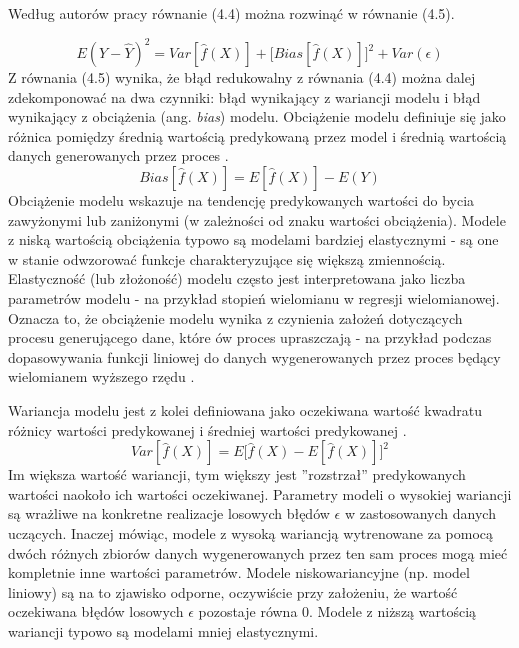 \documentclass[notitlepage]{report}
\begin{document}
Według autorów pracy \cite{islr} równanie (4.4) można rozwinąć w równanie (4.5).

\begin{equation}
E(Y-\hat{Y})^2 = Var[\hat{f}(X)] + \big[Bias[\hat{f}(X)]\big]^2 + Var(\epsilon)
\end{equation}
Z równania (4.5) wynika, że błąd redukowalny z równania (4.4) można dalej zdekomponować na dwa czynniki: błąd wynikający z wariancji modelu i błąd wynikający z obciążenia (ang. \textit{bias}) modelu. Obciążenie modelu definiuje się jako różnica pomiędzy średnią wartością predykowaną przez model i średnią wartością danych generowanych przez proces \cite{prml} \cite{eslii} \cite{leborgne}.
\begin{equation}
Bias[\hat{f}(X)] = E[\hat{f}(X)] - E(Y)
\end{equation}
Obciążenie modelu wskazuje na tendencję predykowanych wartości do bycia zawyżonymi lub zaniżonymi (w zależności od znaku wartości obciążenia). Modele z niską wartością obciążenia typowo są modelami bardziej elastycznymi - są one w stanie odwzorować funkcje charakteryzujące się większą zmiennością. Elastyczność (lub złożoność) modelu często jest interpretowana jako liczba parametrów modelu - na przykład stopień wielomianu w regresji wielomianowej. Oznacza to, że obciążenie modelu wynika z czynienia założeń dotyczących procesu generującego dane, które ów proces upraszczają - na przykład podczas dopasowywania funkcji liniowej do danych wygenerowanych przez proces będący wielomianem wyższego rzędu \cite{islr}. 

Wariancja modelu jest z kolei definiowana jako oczekiwana wartość kwadratu różnicy wartości predykowanej i średniej wartości predykowanej \cite{prml} \cite{leborgne}.
\begin{equation}
Var[\hat{f}(X)] = E\big[\hat{f}(X) - E[\hat{f}(X)]\big]^2
\end{equation}
Im większa wartość wariancji, tym większy jest ''rozstrzał'' predykowanych wartości naokoło ich wartości oczekiwanej. Parametry modeli o wysokiej wariancji są wrażliwe na konkretne realizacje losowych błędów $\epsilon$ w zastosowanych danych uczących. Inaczej mówiąc, modele z wysoką wariancją wytrenowane za pomocą dwóch różnych zbiorów danych wygenerowanych przez ten sam proces mogą mieć kompletnie inne wartości parametrów. Modele niskowariancyjne (np. model liniowy) są na to zjawisko odporne, oczywiście przy założeniu, że wartość oczekiwana błędów losowych $\epsilon$ pozostaje równa 0. Modele z niższą wartością wariancji typowo są modelami mniej elastycznymi. 
\end{document}
